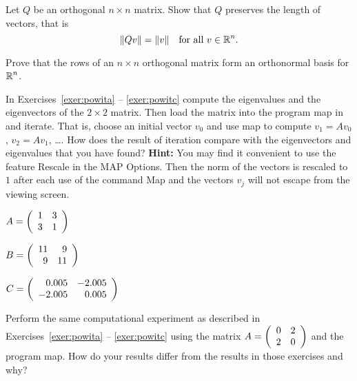 \documentclass{ximera}
\begin{document}
\begin{exercise} \label{c7.9.2}
Let $Q$ be an orthogonal $n\times n$ matrix.
Show that $Q$ preserves the length of vectors, that is
\[
\|Qv\| = \|v\|\quad \mbox{for all $v\in\mbox{$\Bbb{R}$}^n$.}
\]
\end{exercise}

\begin{exercise}  \label{c7.9.45}
Prove that the rows of an $n\times n$ orthogonal matrix form an orthonormal
basis for $\mbox{$\Bbb{R}$}^n$.
\end{exercise}


\CEXER

\noindent In Exercises~\ref{exer:powita} -- \ref{exer:powitc}
compute the eigenvalues and the eigenvectors of the 
$2\times 2$ matrix.  Then load the matrix into the program {\sf map}
 in \Matlab and iterate.  That is, choose an initial
vector $v_0$ and use {\sf map} to compute $v_1=Av_0$, $v_2=Av_1$, \ldots.
How does the result of iteration compare with the eigenvectors and
eigenvalues that you have found?
{\bf Hint:} You may find it convenient to use the feature {\sf Rescale} in
the {\sf MAP Options}.  Then the norm of the vectors is rescaled to $1$
after each use of the command {\sf Map} and the vectors $v_j$ will not
escape from the viewing screen.
\begin{exercise}  \label{exer:powita}
$A=\left(\begin{array}{rr} 1 & 3\\ 3 &1\end{array}\right)$
\end{exercise}
\begin{exercise}  \label{exer:powitb}
$B=\left(\begin{array}{rr} 11 & 9\\ 9 &11\end{array}\right)$
\end{exercise}
\begin{exercise}  \label{exer:powitc}
$C=\left(\begin{array}{rr} 0.005 & -2.005\\ -2.005 &0.005\end{array}\right)$
\end{exercise}

\begin{exercise} \label{c7.7.3}
Perform the same computational experiment as described in
Exercises~\ref{exer:powita} -- \ref{exer:powitc} using the matrix
$A=\left(\begin{array}{rr} 0 & 2\\ 2 &0\end{array}\right)$
and the program {\sf map}.  How do your results differ from the results
in those exercises and why?
\end{exercise}
\end{document}
